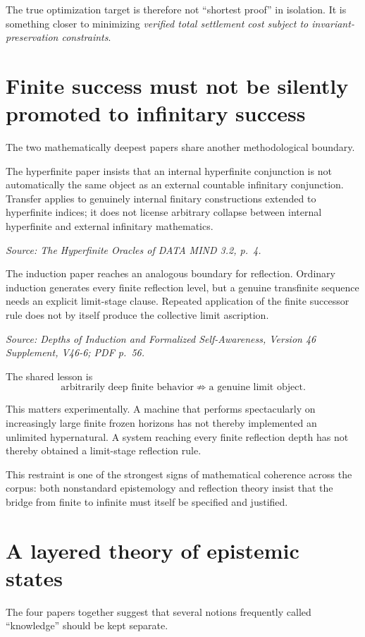 \documentclass[11pt]{article}
\newcommand{\src}[1]{\par\smallskip\noindent\textit{Source: #1}\normalsize}
\begin{document}
The true optimization target is therefore not ``shortest proof'' in isolation. It is something closer to minimizing \emph{verified total settlement cost subject to invariant-preservation constraints}.

\section{Finite success must not be silently promoted to infinitary success}

The two mathematically deepest papers share another methodological boundary.

The hyperfinite paper insists that an internal hyperfinite conjunction is not automatically the same object as an external countable infinitary conjunction. Transfer applies to genuinely internal finitary constructions extended to hyperfinite indices; it does not license arbitrary collapse between internal hyperfinite and external infinitary mathematics.
\src{\emph{The Hyperfinite Oracles of DATA MIND 3.2}, p.~4.}

The induction paper reaches an analogous boundary for reflection. Ordinary induction generates every finite reflection level, but a genuine transfinite sequence needs an explicit limit-stage clause. Repeated application of the finite successor rule does not by itself produce the collective limit ascription.
\src{\emph{Depths of Induction and Formalized Self-Awareness}, Version 46 Supplement, V46-6; PDF p.~56.}

The shared lesson is
\[
\text{arbitrarily deep finite behavior}
\not\Rightarrow
\text{a genuine limit object}.
\]

This matters experimentally. A machine that performs spectacularly on increasingly large finite frozen horizons has not thereby implemented an unlimited hypernatural. A system reaching every finite reflection depth has not thereby obtained a limit-stage reflection rule.

This restraint is one of the strongest signs of mathematical coherence across the corpus: both nonstandard epistemology and reflection theory insist that the bridge from finite to infinite must itself be specified and justified.

\section{A layered theory of epistemic states}

The four papers together suggest that several notions frequently called ``knowledge'' should be kept separate.
\end{document}
